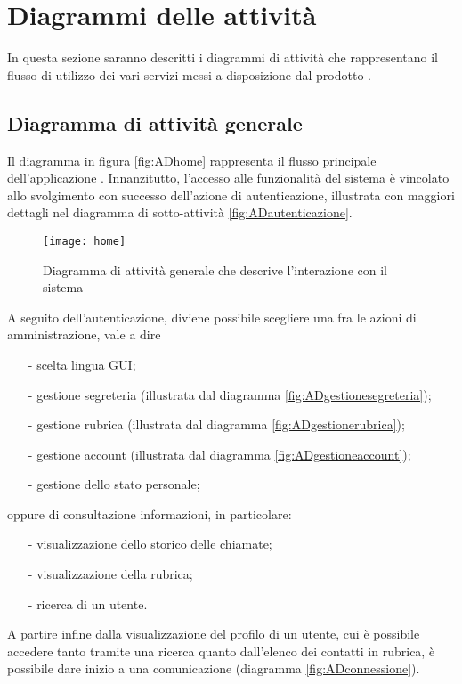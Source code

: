 \section{Diagrammi delle attività}
In questa sezione saranno descritti i diagrammi di attività che rappresentano il flusso di utilizzo dei vari servizi messi a disposizione dal prodotto \caName.

\subsection{Diagramma di attività generale}

Il diagramma in figura \vref{fig:ADhome} rappresenta il flusso principale dell'applicazione \caName. Innanzitutto, l'accesso alle funzionalità del sistema è vincolato allo svolgimento con successo dell'azione di autenticazione, illustrata con maggiori dettagli nel diagramma di sotto-attività \vref{fig:ADautenticazione}.

\begin{figure}[H]
\centering
\texttt{[image: home]}
\caption{Diagramma di attività generale che descrive l'interazione con il sistema}\label{fig:ADhome}
\end{figure}

A seguito dell'autenticazione, diviene possibile scegliere una fra le azioni di amministrazione, vale a dire
\begin{itemize}[noitemsep,nolistsep]
  \item[-] scelta lingua GUI;
  \item[-] gestione segreteria (illustrata dal diagramma \ref{fig:ADgestionesegreteria});
  \item[-] gestione rubrica (illustrata dal diagramma \ref{fig:ADgestionerubrica});
  \item[-] gestione account (illustrata dal diagramma \ref{fig:ADgestioneaccount});
  \item[-] gestione dello stato personale;
\end{itemize}
oppure di consultazione informazioni, in particolare:
\begin{itemize}[noitemsep,nolistsep]
  \item[-] visualizzazione dello storico delle chiamate;
  \item[-] visualizzazione della rubrica;
  \item[-] ricerca di un utente.
\end{itemize}

A partire infine dalla visualizzazione del profilo di un utente, cui è possibile accedere tanto tramite una ricerca quanto dall'elenco dei contatti in rubrica, è possibile dare inizio a una comunicazione (diagramma \vref{fig:ADconnessione}).

